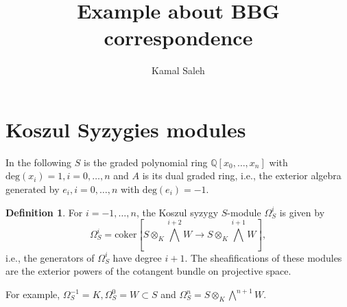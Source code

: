\documentclass[16pt,a4paper]{extarticle}
\title{Example about BBG correspondence}
\author{Kamal Saleh}
\theoremstyle{definition}
\newtheorem{definition}{Definition}
\begin{document}
\maketitle

\tableofcontents

\section{Koszul Syzygies modules}
In the following $S$ is the graded polynomial ring $\mathbb{Q}[x_0,\dots,x_n]$ with 
$\mathrm{deg}(x_i)=1,i=0,\dots,n$ and $A$ is its dual graded ring, i.e., the exterior algebra
generated by $e_i,i=0,\dots,n$ with $\mathrm{deg}(e_i)=-1$.
\begin{definition}
	For $i=-1,\dots,n$, the Koszul syzygy $S$-module $\Omega_S^i$ is given by
	$$\Omega_S^i=\mathrm{coker}[S\otimes_K \bigwedge^{i+2} W \rightarrow S\otimes_K\bigwedge^{i+1} W],$$
 i.e., the generators of $\Omega_S^{i}$ have degree $i+1$. The sheafifications of these modules are the exterior powers of
 the cotangent bundle on projective space.
 \end{definition}
For example, $\Omega_S^{-1}=K,\Omega_S^{0}=W\subset S$ and $\Omega_S^{n}=S\otimes_K \bigwedge^{n+1} W$.
\end{document}
